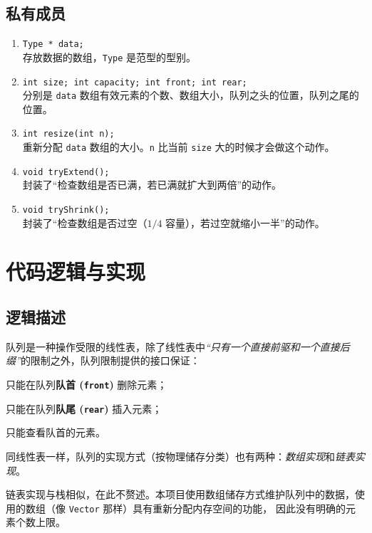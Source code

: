 {\subsection{私有成员}
\begin{enumerate}
    \item \lstinline{Type * data;} \\
          存放数据的数组，\lstinline{Type} 是范型的型别。
    \item \lstinline{int size; int capacity; int front; int rear;} \\
          分别是 \lstinline{data} 数组有效元素的个数、数组大小，队列之头的位置，队列之尾的位置。\\
    \item \lstinline{int resize(int n);} \\
          重新分配 \lstinline{data} 数组的大小。\lstinline{n} 比当前 \lstinline{size} 大的时候才会做这个动作。
    \item \lstinline{void tryExtend();} \\
          封装了“检查数组是否已满，若已满就扩大到两倍”的动作。
    \item \lstinline{void tryShrink();} \\
          封装了“检查数组是否过空（$1/4$ 容量），若过空就缩小一半”的动作。
\end{enumerate}
}

\section{代码逻辑与实现}

\subsection{逻辑描述}


队列是一种操作受限的线性表，除了线性表中\emph{“只有一个直接前驱和一个直接后缀”}的限制之外，队列限制提供的接口保证：%
\begin{inparaenum}
      \item 只能在队列{\bfseries 队首 (\lstinline{front})} 删除元素；
      \item 只能在队列{\bfseries 队尾 (\lstinline{rear})} 插入元素；
      \item 只能查看队首的元素。
\end{inparaenum}
同线性表一样，队列的实现方式（按物理储存分类）也有两种：\emph{数组实现}和\emph{链表实现}。

链表实现与栈相似，在此不赘述。本项目使用数组储存方式维护队列中的数据，使用的数组（像 \lstinline{Vector} 那样）具有重新分配内存空间的功能，%
因此没有明确的元素个数上限。

